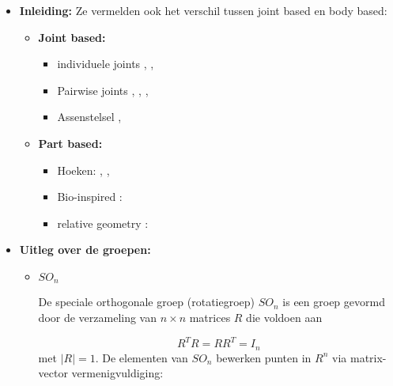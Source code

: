 \begin{itemize}	
	\item \textbf{Inleiding:} Ze vermelden ook het verschil tussen joint based en body based: 
	\begin{itemize}
		\item \textbf{Joint based:}
		\begin{itemize}
			\item individuele joints \cite{Gowayyed2013}, \cite{Gu2010}, \cite{Hussein2013}
			\item Pairwise joints \cite{Wang2012b}, \cite{Wang2013}, \cite{Wei2013}, \cite{Yang2012}
			\item Assenstelsel \cite{Xia2012}, \cite{Zhanpeng2013}
		\end{itemize}
		\item  \textbf{Part based:}
		\begin{itemize}
			\item Hoeken: \cite{Ofli2012}, \cite{Ohn-Bar2013}, \cite{JaeyongSung2012}
			\item Bio-inspired : \cite{Chaudhry2013}
			\item relative geometry : \cite{Vemulapalli2014}
		\end{itemize}
	\end{itemize}
	\item \textbf{Uitleg over de groepen:}
	\begin{itemize}
		\item \textbf{$SO_n$}
		
		De speciale orthogonale groep (rotatiegroep) $SO_n$ is een groep gevormd door de verzameling van $n \times n$ matrices $R$ die voldoen aan
		
		$$R^TR = RR^T = I_n$$
		met $|R| = 1$. De elementen van $SO_n$ bewerken punten in $R^n$ via matrix-vector vermenigvuldiging:
		

\end{itemize}
\end{itemize}
